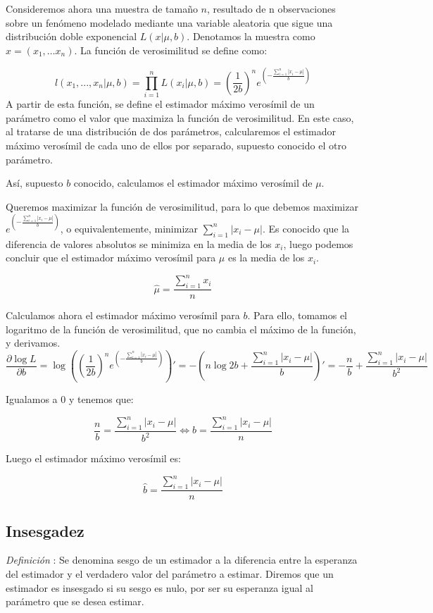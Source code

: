 \documentclass[a4paper, 10pt]{article} %
\newcounter{def}
\begin{document}
Consideremos ahora una muestra de tamaño $n$, resultado de n observaciones sobre un fenómeno modelado mediante una variable aleatoria que sigue una distribución doble exponencial $L(x|\mu, b)$. Denotamos la muestra como $x = \left(x_1, \dots x_n\right)$. La función de verosimilitud se define como: 

$$l(x_1,...,x_n|\mu, b)=\prod_{i=1}^{n} L(x_i|\mu, b) = \left(\frac{1}{2b}\right)^n 
e^{\left(-\frac{\sum_{i=1}^{n}|x_i-\mu|}{b}\right)}
$$
A partir de esta función, se define el estimador máximo verosímil de un parámetro como el valor que maximiza la función de verosimilitud. En este caso, al tratarse de una distribución de dos parámetros, calcularemos el estimador máximo verosímil de cada uno de ellos por separado, supuesto conocido el otro parámetro. 

Así, supuesto $b$ conocido, calculamos el estimador máximo verosímil de $\mu$. 

Queremos maximizar la función de verosimilitud, para lo que debemos maximizar $e^{\left(-\frac{\sum_{i=1}^{n}|x_i-\mu|}{b}\right)}$, o equivalentemente, minimizar $\sum_{i=1}^{n}|x_i-\mu|$. Es conocido que la diferencia de valores absolutos se minimiza en la media de los $x_i$, luego podemos concluir que el estimador máximo verosímil para $\mu$ es la media de los $x_i$. 

$$\hat{\mu} = \frac{\sum_{i=1}^{n}x_i}{n}$$


Calculamos ahora el estimador máximo verosímil para $b$. Para ello, tomamos el logaritmo de la función de verosimilitud, que no cambia el máximo de la función, y derivamos. 
$$\frac{\partial \log L}{\partial b} = \log \left(\left(\frac{1}{2b}\right)^n 
e^{\left(-\frac{\sum_{i=1}^{n}|x_i-\mu|}{b}\right)}\right)' = -\left(n\log 2b + \frac{\sum_{i=1}^{n}|x_i - \mu|}{b}\right)' = 
-\frac{n}{b} + \frac{\sum_{i=1}^{n}|x_i - \mu|}{b^2}$$

Igualamos a 0 y tenemos que: 

$$\frac{n}{b} = \frac{\sum_{i=1}^{n}|x_i - \mu|}{b^2} \iff b = \frac{\sum_{i=1}^{n}|x_i - \mu|}{n}$$

Luego el estimador máximo verosímil es: 

$$\hat{b} = \frac{\sum_{i=1}^{n}|x_i - \mu|}{n}$$

\subsection{Insesgadez}
\addtocounter{def}{1}
\emph{Definición }: Se denomina sesgo de un estimador a la diferencia entre la esperanza del estimador
y el verdadero valor del parámetro a estimar. Diremos que un estimador es insesgado si su sesgo es nulo, por ser
su esperanza igual al parámetro que se desea estimar.
\end{document}
